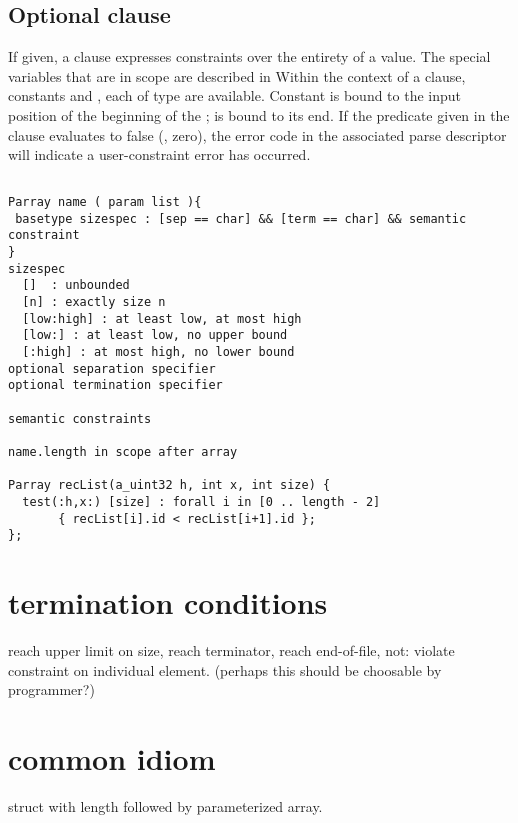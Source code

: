 \subsection{Optional \Pwhere{} clause}
If given, a \Pwhere{} clause expresses constraints over the entirety
of a \Parray{} value.  The special variables that are in scope are
described in 
Within the context of a 
\Pparsecheck{} clause, constants  and , each of type 
\PDCpost{} are available.  Constant  is bound to the input
position of the beginning of the \Parray{};  is bound to its end.
If the predicate given in
the \Pwhere{} clause evaluates to false (\ie{}, zero), the error code
in the associated parse descriptor will indicate a user-constraint
error has occurred.  


\subsection{\Pparsecheck}
\subsection{\Pforall}
\begin{verbatim}
Parray name ( param list ){
 basetype sizespec : [sep == char] && [term == char] && semantic constraint
}
sizespec 
  []  : unbounded
  [n] : exactly size n
  [low:high] : at least low, at most high
  [low:] : at least low, no upper bound
  [:high] : at most high, no lower bound
optional separation specifier
optional termination specifier

semantic constraints

name.length in scope after array

Parray recList(a_uint32 h, int x, int size) {
  test(:h,x:) [size] : forall i in [0 .. length - 2]
       { recList[i].id < recList[i+1].id };
};
\end{verbatim}

\section{termination conditions}
reach upper limit on size, reach terminator, reach end-of-file, 
not: violate constraint on individual element. (perhaps this should be
choosable by programmer?)


\section{common idiom}
struct with length followed by parameterized array.


